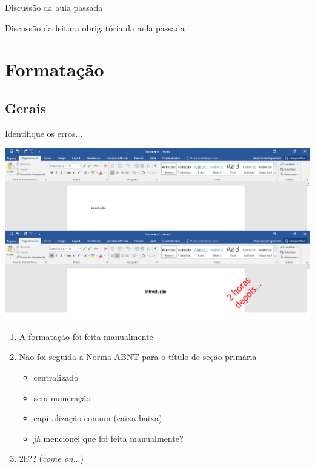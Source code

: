 \documentclass{beamer}
\begin{document}


\begin{frame}{Discussão da aula passada}
  \begin{block}{}
    Discussão da leitura obrigatória da aula passada
  \end{block}
\end{frame}

\section{Formatação}

\subsection{Gerais}

\begin{frame}{\scriptsize Identifique os erros...}
  \begin{center}
    \includegraphics[width=1.2\textwidth]{EstruturaII/intro}
  \end{center}
\end{frame}

\begin{frame}{\scriptsize }
  \begin{enumerate}
    \footnotesize
  \item A formatação foi feita manualmente
    \bigskip
  \item Não foi seguida a Norma ABNT para o título de seção primária
    \begin{itemize}
      \tiny
    \item centralizado
    \item sem numeração
    \item capitalização comum (caixa baixa)
    \item já mencionei que foi feita manualmente?
    \end{itemize}
    \bigskip
  \item 2h?? ({\em come on}...)
  \end{enumerate}
\end{frame}
\end{document}
